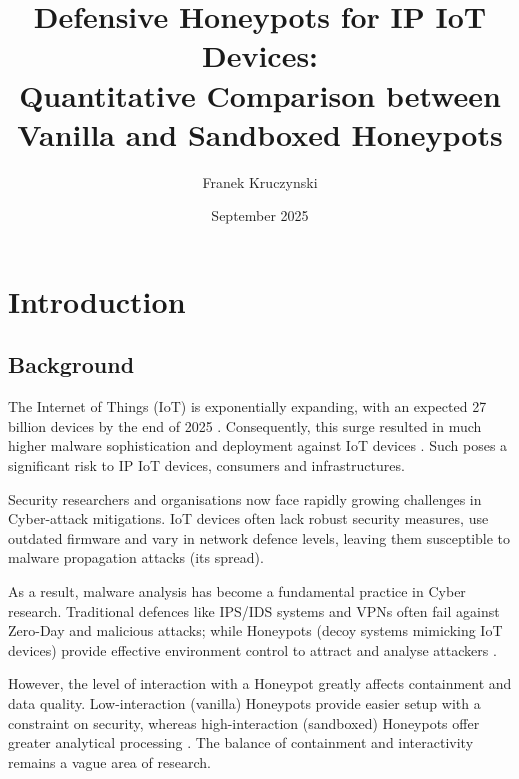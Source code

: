 \documentclass[a4paper,12pt,oneside]{book}			%
\title{\huge\bfseries Defensive Honeypots for IP IoT Devices:\\Quantitative  Comparison between Vanilla and Sandboxed Honeypots}
\author{\LARGE Franek Kruczynski}
\date{September 2025}
\begin{document}
\frontmatter			%
\maketitle				%
\setcounter{page}{1}		%
\pagestyle{fancy}

\tableofcontents 			%

\mainmatter 			%
\clearpage			




\chapter{Introduction}\label{ch:intro}		%
\section{Background}\label{sec:background}	%

The Internet of Things (IoT) is exponentially expanding, with an expected 27 billion devices by the end of 2025 \textit{\citep{autobits2025iot}}. Consequently, this surge resulted in much higher malware sophistication and deployment against IoT devices \textit{\citep{cornell-malware-analysis}}. Such poses a significant risk to IP IoT devices, consumers and infrastructures.

Security researchers and organisations now face rapidly growing challenges in Cyber-attack mitigations. IoT devices often lack robust security measures, use outdated firmware \textit{\citep{security-issue-inIoT}} and vary in network defence levels, leaving them susceptible to malware propagation attacks (its spread).

As a result, malware analysis has become a fundamental practice in Cyber research. Traditional defences like IPS/IDS systems and VPNs often fail against Zero-Day and malicious attacks; while Honeypots (decoy systems mimicking IoT devices) provide effective environment control to attract and analyse attackers \textit{\citep{crowdstrike-honeypot}}.

However, the level of interaction with a Honeypot greatly affects containment and data quality. Low-interaction (vanilla) Honeypots provide easier setup with a constraint on security, whereas high-interaction (sandboxed) Honeypots offer greater analytical processing \textit{\citep{Kocaogullar2023honeypots}}. The balance of containment and interactivity remains a vague area of research. 
\end{document}
